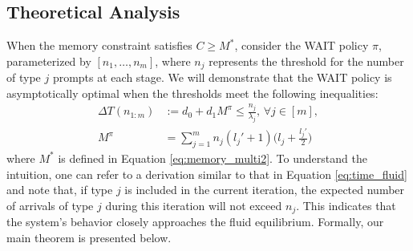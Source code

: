\subsection{Theoretical Analysis}
\label{subsec:main_theorem}
When the memory constraint satisfies \(C \geq M^*\), consider the WAIT policy \(\pi\), parameterized by \([n_1, \dots, n_m]\), where \(n_j\) represents the threshold for the number of type \(j\) prompts at each stage. We will demonstrate that the WAIT policy is asymptotically optimal when the thresholds meet the following inequalities:
\begin{equation}
\label{eq:wait_thresholds}
\begin{aligned}
\Delta T(n_{1:m}) &:= d_0 + d_1 M^{\pi} \leq \tfrac{n_j}{\lambda_j},\, \forall j\in[m],\\
 M^{\pi} &= \sum_{j=1}^m n_j (l_j' + 1) \big(l_j + \tfrac{l_j'}{2}\big)
\end{aligned}
\end{equation}
where \(M^*\) is defined in Equation \eqref{eq:memory_multi2}. To understand the intuition, one can refer to a derivation similar to that in Equation \eqref{eq:time_fluid} and note that, if type \(j\) is included in the current iteration, the expected number of arrivals of type \(j\) during this iteration will not exceed \(n_j\). This indicates that the system’s behavior closely approaches the fluid equilibrium. Formally, our main theorem is presented below.



